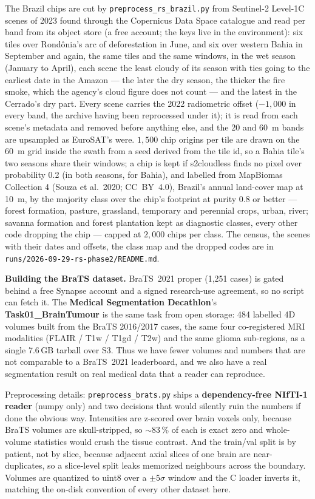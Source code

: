 The Brazil chips are cut by \texttt{preprocess\_rs\_brazil.py} from
Sentinel-2 Level-1C scenes of 2023 found through the Copernicus Data Space
catalogue and read per band from its object store (a free account; the keys
live in the environment): six tiles over Rond\^onia's arc of deforestation
in June, and six over western Bahia in September and again, the same tiles
and the same windows, in the wet season (January to April), each scene the
least cloudy of its season with ties going to the earliest date in the
Amazon --- the later the dry season, the thicker the fire smoke, which the
agency's cloud figure does not count --- and the latest in the Cerrado's
dry part. Every scene carries the 2022 radiometric offset ($-1{,}000$ in
every band, the archive having been reprocessed under it); it is read from
each scene's metadata and removed before anything else, and the 20 and
60~m bands are upsampled as EuroSAT's were. $1{,}500$ chip origins per tile
are drawn on the 60~m grid inside the swath from a seed derived from the
tile id, so a Bahia tile's two seasons share their windows; a chip is kept
if s2cloudless finds no pixel over probability 0.2 (in both seasons, for
Bahia), and labelled from MapBiomas Collection 4 (Souza et al.\ 2020;
CC~BY~4.0), Brazil's annual land-cover map at 10~m, by the majority class
over the chip's footprint at purity 0.8 or better --- forest formation,
pasture, grassland, temporary and perennial crops, urban, river; savanna
formation and forest plantation kept as diagnostic classes, every other
code dropping the chip --- capped at $2{,}000$ chips per class. The census,
the scenes with their dates and offsets, the class map and the dropped
codes are in \texttt{runs/2026-09-29-rs-phase2/README.md}.

\medskip\noindent\textbf{Building the BraTS dataset.}
BraTS~2021 proper (1{,}251 cases) is
gated behind a free Synapse account and a signed research-use
agreement, so no script can fetch it. The \textbf{Medical
Segmentation Decathlon}'s \textbf{Task01\_BrainTumour} is the same task
from open storage: 484 labelled 4D volumes built from the BraTS
2016/2017 cases, the same four co-registered MRI modalities
(FLAIR / T1w / T1gd / T2w) and the same glioma sub-regions, as a single
7.6\,GB tarball over S3. Thus we have fewer volumes and numbers that are
not comparable to a BraTS~2021 leaderboard, and we also have a
real segmentation result on real medical data that a reader can
reproduce.

\smallskip\noindent Preprocessing details:
\texttt{preprocess\_brats.py} ships a \textbf{dependency-free NIfTI-1
reader} (numpy only) and two decisions that would silently ruin the
numbers if done the obvious way. Intensities are z-scored over
brain voxels only, because BraTS volumes are skull-stripped, so
$\sim$83\,\% of each is exact zero and whole-volume statistics would
crush the tissue contrast. And the train/val split is by patient,
not by slice, because adjacent axial slices of one brain are
near-duplicates, so a slice-level split leaks memorized neighbours across
the boundary.
Volumes are quantized to uint8 over a $\pm5\sigma$ window and the C
loader inverts it, matching the on-disk convention of every other dataset
here.

